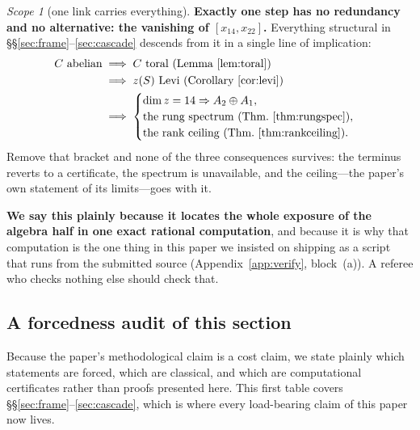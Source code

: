 \documentclass[11pt,reqno]{amsart}
\theoremstyle{plain}
\theoremstyle{definition}
\theoremstyle{remark}
\newtheorem{scope}[theorem]{Scope}
\begin{document}
\begin{scope}[one link carries everything]\label{sc:onebracket}
\textbf{Exactly one step has no redundancy and no alternative: the vanishing of
$[x_{14},x_{22}]$.} Everything structural in \S\S\ref{sec:frame}--\ref{sec:cascade}
descends from it in a single line of implication:
\[
  \begin{aligned}
  C\ \text{abelian}
    &\;\Longrightarrow\; C\ \text{toral (Lemma~\ref{lem:toral})}\\
    &\;\Longrightarrow\; z(S)\ \text{Levi (Corollary~\ref{cor:levi})}\\
    &\;\Longrightarrow\;
      \begin{cases}
        \dim z=14\Rightarrow A_2\oplus A_1,\\
        \text{the rung spectrum (Thm.~\ref{thm:rungspec})},\\
        \text{the rank ceiling (Thm.~\ref{thm:rankceiling})}.
      \end{cases}
  \end{aligned}
\]
Remove that bracket and none of the three consequences survives: the terminus reverts to
a certificate, the spectrum is unavailable, and the ceiling---the paper's own statement
of its limits---goes with it.

\textbf{We say this plainly because it locates the whole exposure of the algebra half in
one exact rational computation}, and because it is why that computation is the one thing
in this paper we insisted on shipping as a script that runs from the submitted source
(Appendix~\ref{app:verify}, block~(a)). A referee who checks nothing else should check
that.
\end{scope}

\subsection{A forcedness audit of this section}\label{sec:audit}

Because the paper's methodological claim is a cost claim, we state plainly which
statements are forced, which are classical, and which are computational certificates
rather than proofs presented here. This first table covers
\S\S\ref{sec:frame}--\ref{sec:cascade}, which is where every load-bearing claim of
this paper now lives.
\end{document}
